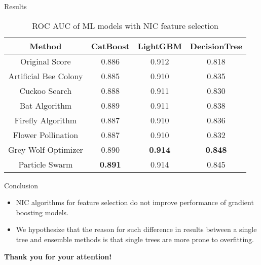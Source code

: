 \documentclass[aspectratio=169,xcolor=dvipsnames]{beamer}
\begin{document}
\begin{frame}{Results}
	\begin{table}
		\centering
		\caption{ROC AUC of ML models with NIC feature selection}
		\label{tab:results}
		\begin{tabular}{c c c c}
			\hline
			Method                & CatBoost       & LightGBM       & DecisionTree   \\
			\hline
			Original Score        & 0.886 	       & 0.912          & 0.818          \\
			Artificial Bee Colony & 0.885          & 0.910          & 0.835          \\
			Cuckoo Search         & 0.888          & 0.911          & 0.830          \\
			Bat Algorithm         & 0.889          & 0.911          & 0.838          \\
			Firefly Algorithm     & 0.887          & 0.910          & 0.836          \\
			Flower Pollination    & 0.887          & 0.910          & 0.832 \\
			Grey Wolf Optimizer   & 0.890          & \textbf{0.914} & \textbf{0.848}          \\
			Particle Swarm        & \textbf{0.891} & 0.914          & 0.845          \\
			\hline
		\end{tabular}
	\end{table}
\end{frame}

\begin{frame}{Conclusion}
	\begin{itemize}
		\item NIC algorithms for feature selection do not improve
		      performance of gradient boosting models.
		\item We hypothesize that the reason for such difference
		      in results between a single tree and ensemble methods is that
		      single trees are more prone to overfitting.
	\end{itemize}
\end{frame}

\begin{frame}
	\Huge{\centerline{\textbf{Thank you for your attention!}}}
\end{frame}

\end{document}
